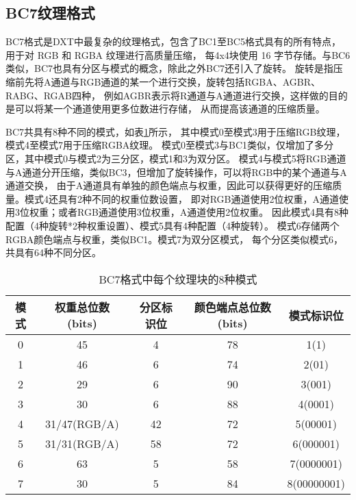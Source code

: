 \subsection{BC7纹理格式}

BC7格式是DXT中最复杂的纹理格式，包含了BC1至BC5格式具有的所有特点，
用于对 RGB 和 RGBA 纹理进行高质量压缩，
每4x4块使用 16 字节存储。与BC6类似，BC7也具有分区与模式的概念，除此之外BC7还引入了旋转。
旋转是指压缩前先将A通道与RGB通道的某一个进行交换，旋转包括RGBA、AGBR、RABG、RGAB四种，
例如AGBR表示将R通道与A通道进行交换，这样做的目的是可以将某一个通道使用更多位数进行存储，
从而提高该通道的压缩质量。

BC7共具有8种不同的模式，如表\ref{tab:BC7Mode}所示，
其中模式0至模式3用于压缩RGB纹理，模式4至模式7用于压缩RGBA纹理。
模式0至模式3与BC1类似，仅增加了多分区，其中模式0与模式2为三分区，模式1和3为双分区。
模式4与模式5将RGB通道与A通道分开压缩，类似BC3，但增加了旋转操作，可以将RGB中的某个通道与A通道交换，
由于A通道具有单独的颜色端点与权重，因此可以获得更好的压缩质量。模式4还具有2种不同的权重位数设置，
即对RGB通道使用2位权重，A通道使用3位权重；或者RGB通道使用3位权重，A通道使用2位权重。
因此模式4具有8种配置（4种旋转*2种权重设置）、模式5具有4种配置（4种旋转）。
模式6存储两个RGBA颜色端点与权重，类似BC1。模式7为双分区模式，
每个分区类似模式6，共具有64种不同分区。

\begin{table}[htbp]
    \centering
    \caption{BC7格式中每个纹理块的8种模式\cite{BC7}}
    \label{tab:BC7Mode}        
    \begin{tabular}{ccccc}
    \toprule
    模式 & 权重总位数(bits) & 分区标识位 & 颜色端点总位数(bits) & 模式标识位\\
    \midrule
    0   &   45    &  4  &   78  &   1(1)   \\
    1   &   46    &  6  &   74  &   2(01)   \\
    2   &   29    &  6  &   90  &   3(001)   \\
    3   &   30    &  6  &   88  &   4(0001)   \\
    4   &   31/47(RGB/A)    &  42  &   72  &   5(00001)   \\
    5   &   31/31(RGB/A)    &  58  &   72  &   6(000001)   \\
    6   &   63    &  5  &   58  &   7(0000001)   \\
    7   &   30    &  5  &   84  &   8(00000001)   \\
    \bottomrule
    \end{tabular}
\end{table}

